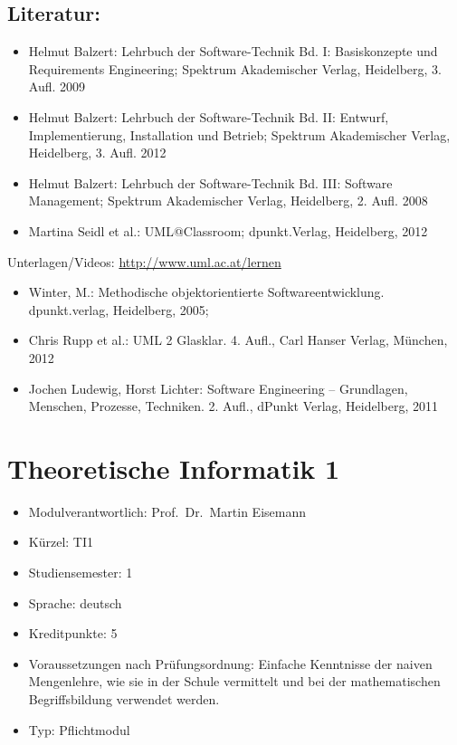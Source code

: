 \section*{Literatur:}\label{literatur-18}

\begin{itemize}
\tightlist
\item
  Helmut Balzert: Lehrbuch der Software-Technik Bd. I: Basiskonzepte und
  Requirements Engineering; Spektrum Akademischer Verlag, Heidelberg, 3.
  Aufl. 2009
\item
  Helmut Balzert: Lehrbuch der Software-Technik Bd. II: Entwurf,
  Implementierung, Installation und Betrieb; Spektrum Akademischer
  Verlag, Heidelberg, 3. Aufl. 2012
\item
  Helmut Balzert: Lehrbuch der Software-Technik Bd. III: Software
  Management; Spektrum Akademischer Verlag, Heidelberg, 2. Aufl. 2008
\item
  Martina Seidl et al.: UML@Classroom; dpunkt.Verlag, Heidelberg, 2012
\end{itemize}

Unterlagen/Videos: \href{http://www.uml.ac.at/lernen}{http://www.uml.ac.at/lernen}

\begin{itemize}
\tightlist
\item
  Winter, M.: Methodische objektorientierte Softwareentwicklung.
  dpunkt.verlag, Heidelberg, 2005;
\item
  Chris Rupp et al.: UML 2 Glasklar. 4. Aufl., Carl Hanser Verlag,
  München, 2012
\item
  Jochen Ludewig, Horst Lichter: Software Engineering -- Grundlagen,
  Menschen, Prozesse, Techniken. 2. Aufl., dPunkt Verlag, Heidelberg,
  2011
\end{itemize}

\chapter{Theoretische Informatik 1}\label{theoretische-informatik-1}

\begin{itemize}
\tightlist
\item
  Modulverantwortlich: Prof.~Dr.~Martin Eisemann
\item
  Kürzel: TI1
\item
  Studiensemester: 1
\item
  Sprache: deutsch
\item
  Kreditpunkte: 5
\item
  Voraussetzungen nach Prüfungsordnung: Einfache Kenntnisse der naiven
  Mengenlehre, wie sie in der Schule vermittelt und bei der
  mathematischen Begriffsbildung verwendet werden.
\item
  Typ: Pflichtmodul
\end{itemize}

